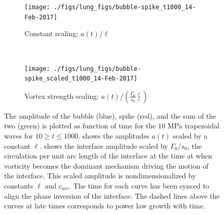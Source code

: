 \documentclass{jfm}%
\begin{document}
\begin{figure}
  \centering
  \begin{subfigure}[t]{0.45\textwidth}
    \centering
    \texttt{[image: ./figs/lung\_figs/bubble-spike\_t1000\_14-Feb-2017]}
    \caption{\label{fig:trapz_bubble-spike_t1000_unscaled} Constant scaling: $a(t)/\ell$}
  \end{subfigure}
  ~
  \begin{subfigure}[t]{0.45\textwidth}
        \texttt{[image: ./figs/lung\_figs/bubble-spike\_scaled\_t1000\_14-Feb-2017]}
    \caption{\label{fig:trapz_bubble-spike_t1000_scaled} Vortex strength scaling: $a(t)/\left(\frac{\Gamma_0}{s_0}\frac{\ell}{c}\right)$}
  \end{subfigure}
  \caption{The amplitude of the bubble (blue), spike (red), and the
    sum of the two (green) is plotted as function of time for the $10$
    MPa trapezoidal waves for $10\geq t\leq
    1000$.  shows the
    amplitudes $a(t)$ scaled by a constant
    $\ell$.  shows the
    interface amplitude scaled by $\Gamma_0/s_0$, the circulation per
    unit arc length of the interface at the time at when vorticity
    becomes the dominant mechanism driving the motion of the
    interface. This scaled amplitude is nondimensionalized by
    constants $\ell$ and $c_{air}$. The time for each curve has been
    synced to align the phase inversion of the interface. The dashed
    lines above the curves at late times corresponds to power law
    growth with time.}
  \label{fig:trapz_bubble-spike_t1000}
\end{figure}
\end{document}
